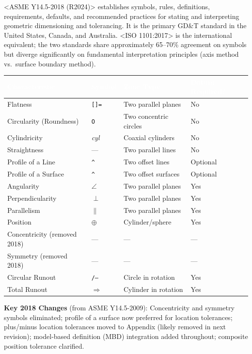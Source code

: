 \documentclass[11pt,letterpaper]{article}
\newcommand{\tableheader}[1]{\textbf{\sffamily\textcolor{white}{#1}}}
\begin{document}
<ASME Y14.5-2018 (R2024)> establishes symbols, rules, definitions, requirements, defaults, and recommended practices for stating and interpreting geometric dimensioning and tolerancing. It is the primary GD\&T standard in the United States, Canada, and Australia. <ISO 1101:2017> is the international equivalent; the two standards share approximately 65--70\% agreement on symbols but diverge significantly on fundamental interpretation principles (axis method vs.\ surface boundary method).

\begin{center}
\begin{tabularx}{\textwidth}{L{2.8cm}C{1.4cm}L{2.5cm}X}
\toprule
{}
\tableheader{Characteristic} & \tableheader{Symbol} & \tableheader{Zone Type} & \tableheader{Datum Required?} \\
\midrule
Flatness & \texttt{[]=} & Two parallel planes & No \\
Circularity (Roundness) & \texttt{O} & Two concentric circles & No \\
Cylindricity & \textit{cyl} & Coaxial cylinders & No \\
Straightness & --- & Two parallel lines & No \\
Profile of a Line & \texttt{\textasciicircum} & Two offset lines & Optional \\
Profile of a Surface & \texttt{\^{}} & Two offset surfaces & Optional \\
Angularity & $\angle$ & Two parallel planes & Yes \\
Perpendicularity & $\perp$ & Two parallel planes & Yes \\
Parallelism & $\parallel$ & Two parallel planes & Yes \\
Position & $\oplus$ & Cylinder/sphere & Yes \\
Concentricity (removed 2018) & --- & --- & --- \\
Symmetry (removed 2018) & --- & --- & --- \\
Circular Runout & \texttt{/--} & Circle in rotation & Yes \\
Total Runout & $\Rightarrow$ & Cylinder in rotation & Yes \\
\bottomrule
\end{tabularx}
\end{center}

\textbf{Key 2018 Changes} (from ASME Y14.5-2009): Concentricity and symmetry symbols eliminated; profile of a surface now preferred for location tolerances; plus/minus location tolerances moved to Appendix (likely removed in next revision); model-based definition (MBD) integration added throughout; composite position tolerance clarified.
\end{document}
